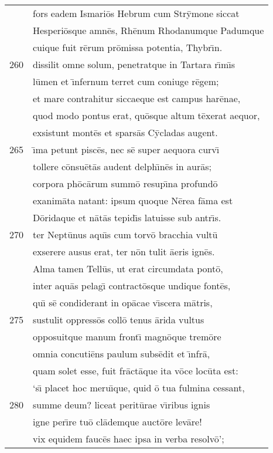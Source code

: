 \documentclass[paper=6in:9in,pagesize=pdftex,
               headinclude=on,footinclude=on,12pt]{scrbook}
\begin{document}
\begin{longtable}[p]{ r l }
 & fors eadem Ismari\=os Hebrum cum Str\=ymone siccat\\ 
 & Hesperi\=osque amn\=es, Rh\=enum Rhodanumque Padumque\\ 
 & cuique fuit r\=erum pr\=omissa potentia, Thybr\={\i}n.\\ 
260 & dissilit omne solum, penetratque in Tartara r\={\i}m\={\i}s\\ 
 & l\=umen et \={\i}nfernum terret cum coniuge r\=egem;\\ 
 & et mare contrahitur siccaeque est campus har\=enae,\\ 
 & quod modo pontus erat, qu\=osque altum t\=exerat aequor,\\ 
 & exsistunt mont\=es et spars\=as C\=ycladas augent.\\ 
265 & \={\i}ma petunt pisc\=es, nec s\=e super aequora curv\={\i}\\ 
 & tollere c\=onsu\=et\=as audent delph\={\i}n\=es in aur\=as;\\ 
 & corpora ph\=oc\=arum summ\=o resup\={\i}na profund\=o\\ 
 & exanim\=ata natant: ipsum quoque N\=erea f\=ama est\\ 
 & D\=oridaque et n\=at\=as tepid\={\i}s latuisse sub antr\={\i}s.\\ 
270 & ter Nept\=unus aqu\={\i}s cum torv\=o bracchia vult\=u\\ 
 & exserere ausus erat, ter n\=on tulit \=aeris ign\=es.\\ 
 & \indent Alma tamen Tell\=us, ut erat circumdata pont\=o,\\ 
 & inter aqu\=as pelag\={\i} contract\=osque undique font\=es,\\ 
 & qu\={\i} s\=e condiderant in op\=acae v\={\i}scera m\=atris,\\ 
275 & sustulit oppress\=os coll\=o tenus \=arida vultus\\ 
 & opposuitque manum front\={\i} magn\=oque trem\=ore\\ 
 & omnia concuti\=ens paulum subs\=edit et \={\i}nfr\=a,\\ 
 & quam solet esse, fuit fr\=act\=aque ita v\=oce loc\=uta est:\\ 
 & `s\={\i} placet hoc meru\={\i}que, quid \=o tua fulmina cessant,\\ 
280 & summe deum? liceat perit\=urae v\={\i}ribus ignis\\ 
 & igne per\={\i}re tu\=o cl\=ademque auct\=ore lev\=are!\\ 
 & vix equidem fauc\=es haec ipsa in verba resolv\=o';\\ 

\end{longtable}
\end{document}
